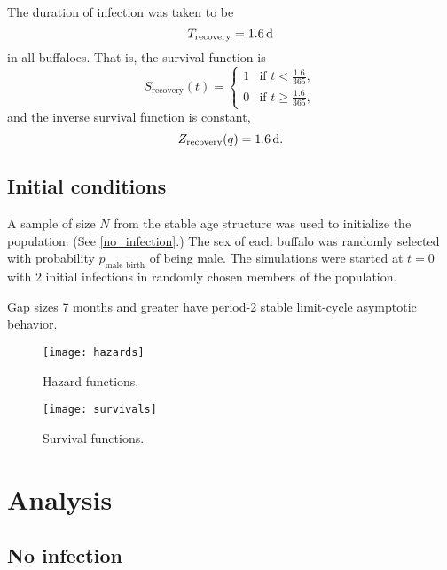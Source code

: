 \documentclass{article}
\begin{document}
The duration of infection was taken to be
\begin{equation}
  T_{\text{recovery}} = \unit[1.6]{d}
\end{equation}
in all buffaloes.  That is, the survival function is
\begin{equation}
  S_{\text{recovery}}(t) =
  \begin{cases}
    1 & \text{if $t < \frac{1.6}{365}$},
    \\
    0 & \text{if $t \geq \frac{1.6}{365}$},
  \end{cases}
\end{equation}
and the inverse survival function is constant,
\begin{equation}
  Z_{\text{recovery}}(q) = \unit[1.6]{d}.
\end{equation}


\subsection{Initial conditions}

A sample of size $N$ from the stable age structure was used to
initialize the population.  (See \autoref{no_infection}.)  The sex of
each buffalo was randomly selected with probability
$p_{\text{male birth}}$ of being male.  The simulations were started
at $t = 0$ with $2$ initial infections in randomly chosen members of
the population.

Gap sizes 7 months and greater have period-2 stable limit-cycle
asymptotic behavior.


\begin{figure}
  \centering
  \texttt{[image: hazards]}
  \caption{Hazard functions.}
  \label{fig:hazard}
\end{figure}


\begin{figure}
  \centering
  \texttt{[image: survivals]}
  \caption{Survival functions.}
  \label{fig:survival}
\end{figure}



\clearpage
\section{Analysis}

\subsection{No infection}
\label{no_infection}
\end{document}
